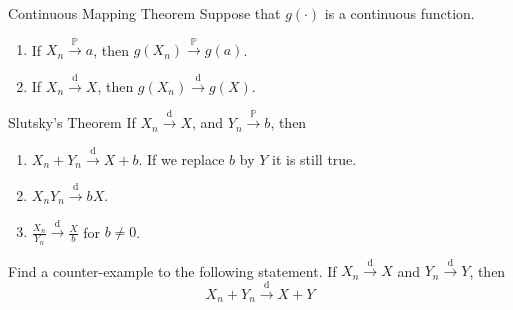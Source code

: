\begin{Theorem}{Continuous Mapping Theorem}{}
    Suppose that $ g(\cdot) $ is a continuous function.
    \begin{enumerate}[label=(\arabic*)]
        \item If $ X_n\stackrel{\mathbb{P}}{\to}a $, then
              $ g(X_n)\stackrel{\mathbb{P}}{\to}g(a) $.
        \item If $ X_n\stackrel{\text{d}}{\to}X $,
              then $ g(X_n)\stackrel{\text{d}}{\to}g(X) $.
    \end{enumerate}
\end{Theorem}
\begin{Theorem}{Slutsky's Theorem}{}
    If $ X_n\stackrel{\text{d}}{\to} X $, and
    $ Y_n\stackrel{\mathbb{P}}{\to}b $, then
    \begin{enumerate}[label=(\alph*)]
        \item $ X_n+Y_n\stackrel{\text{d}}{\to}X+b $.
              If we replace $ b $ by $ Y $ it is still true.
        \item $ X_n Y_n\stackrel{\text{d}}{\to}bX $.
        \item $ \displaystyle \frac{X_n}{Y_n}\stackrel{\text{d}}{\to}
                  \frac{X}{b} $ for $ b\neq 0 $.
    \end{enumerate}
\end{Theorem}
\begin{Exercise}{}{}
    Find a counter-example to the following statement.
    If $ X_n\stackrel{\text{d}}{\to}X $ and $ Y_n\stackrel{\text{d}}{\to}Y $,
    then
    \[ X_n+Y_n\stackrel{\text{d}}{\to}X+Y \]
\end{Exercise}
